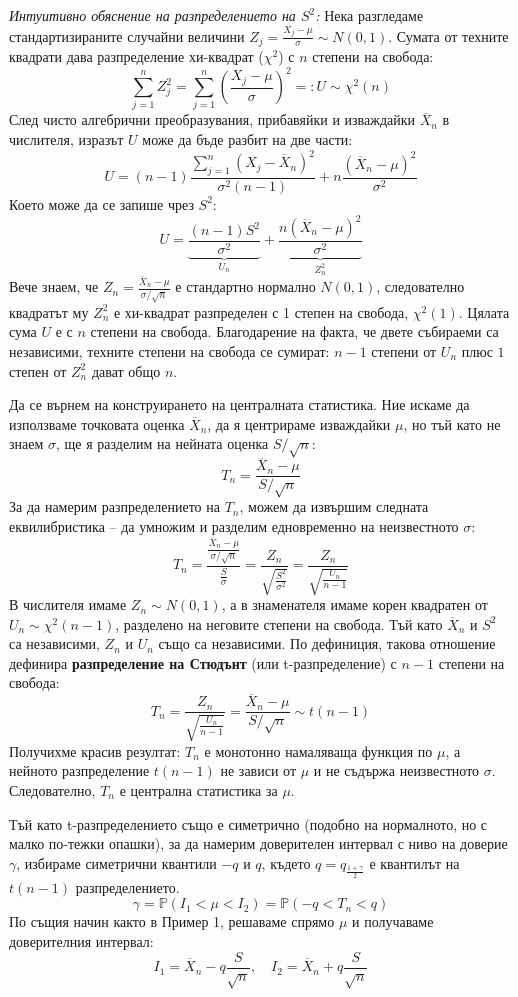 \documentclass{article}
\begin{document}
\textit{Интуитивно обяснение на разпределението на $S^2$:} 
Нека разгледаме стандартизираните случайни величини $Z_j = \frac{X_j - \mu}{\sigma} \sim N(0,1)$. Сумата от техните квадрати дава разпределение хи-квадрат ($\chi^2$) с $n$ степени на свобода:
\[
\sum_{j=1}^n Z_j^2 = \sum_{j=1}^n \left( \frac{X_j - \mu}{\sigma} \right)^2 =: U \sim \chi^2(n)
\]
След чисто алгебрични преобразувания, прибавяйки и изваждайки $\overline{X}_n$ в числителя, изразът $U$ може да бъде разбит на две части:
\[
U = (n-1)\frac{\sum_{j=1}^n (X_j - \overline{X}_n)^2}{\sigma^2(n-1)} + n\frac{(\overline{X}_n - \mu)^2}{\sigma^2}
\]
Което може да се запише чрез $S^2$:
\[
U = \underbrace{\frac{(n-1)S^2}{\sigma^2}}_{U_n} + \underbrace{\frac{n(\overline{X}_n - \mu)^2}{\sigma^2}}_{Z_n^2}
\]
Вече знаем, че $Z_n = \frac{\overline{X}_n - \mu}{\sigma/\sqrt{n}}$ е стандартно нормално $N(0,1)$, следователно квадратът му $Z_n^2$ е хи-квадрат разпределен с 1 степен на свобода, $\chi^2(1)$. Цялата сума $U$ е с $n$ степени на свобода. Благодарение на факта, че двете събираеми са независими, техните степени на свобода се сумират: $n-1$ степени от $U_n$ плюс $1$ степен от $Z_n^2$ дават общо $n$.

Да се върнем на конструирането на централната статистика. Ние искаме да използваме точковата оценка $\overline{X}_n$, да я центрираме изваждайки $\mu$, но тъй като не знаем $\sigma$, ще я разделим на нейната оценка $S / \sqrt{n}$:
\[
T_n = \frac{\overline{X}_n - \mu}{S / \sqrt{n}}
\]
За да намерим разпределението на $T_n$, можем да извършим следната еквилибристика – да умножим и разделим едновременно на неизвестното $\sigma$:
\[
T_n = \frac{\frac{\overline{X}_n - \mu}{\sigma / \sqrt{n}}}{\frac{S}{\sigma}} = \frac{Z_n}{\sqrt{\frac{S^2}{\sigma^2}}} = \frac{Z_n}{\sqrt{\frac{U_n}{n-1}}}
\]
В числителя имаме $Z_n \sim N(0,1)$, а в знаменателя имаме корен квадратен от $U_n \sim \chi^2(n-1)$, разделено на неговите степени на свобода. Тъй като $\overline{X}_n$ и $S^2$ са независими, $Z_n$ и $U_n$ също са независими. По дефиниция, такова отношение дефинира \textbf{разпределение на Стюдънт} (или t-разпределение) с $n-1$ степени на свобода:
\[
T_n = \frac{Z_n}{\sqrt{\frac{U_n}{n-1}}} = \frac{\overline{X}_n - \mu}{S/\sqrt{n}} \sim t(n-1)
\]
Получихме красив резултат: $T_n$ е монотонно намаляваща функция по $\mu$, а нейното разпределение $t(n-1)$ не зависи от $\mu$ и не съдържа неизвестното $\sigma$. Следователно, $T_n$ е централна статистика за $\mu$.

Тъй като t-разпределението също е симетрично (подобно на нормалното, но с малко по-тежки опашки), за да намерим доверителен интервал с ниво на доверие $\gamma$, избираме симетрични квантили $-q$ и $q$, където $q = q_{\frac{1+\gamma}{2}}$ е квантилът на $t(n-1)$ разпределението.
\[
\gamma = \mathbb{P}(I_1 < \mu < I_2) = \mathbb{P}(-q < T_n < q)
\]
По същия начин както в Пример 1, решаваме спрямо $\mu$ и получаваме доверителния интервал:
\[
I_1 = \overline{X}_n - q \frac{S}{\sqrt{n}}, \quad I_2 = \overline{X}_n + q \frac{S}{\sqrt{n}}
\]
\end{document}
